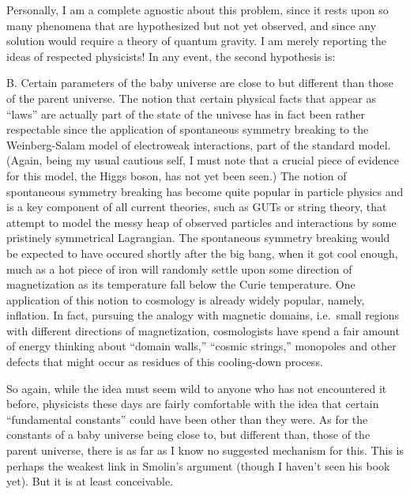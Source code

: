 \documentclass{article}
\begin{document}
Personally, I am a complete agnostic about this problem, since it rests
upon so many phenomena that are hypothesized but not yet observed, and
since any solution would require a theory of quantum gravity. I am
merely reporting the ideas of respected physicists! In any event, the
second hypothesis is:

B. Certain parameters of the baby universe are close to but different
than those of the parent universe. The notion that certain physical
facts that appear as ``laws'' are actually part of the state of the
univese has in fact been rather respectable since the application of
spontaneous symmetry breaking to the Weinberg-Salam model of electroweak
interactions, part of the standard model. (Again, being my usual
cautious self, I must note that a crucial piece of evidence for this
model, the Higgs boson, has not yet been seen.) The notion of
spontaneous symmetry breaking has become quite popular in particle
physics and is a key component of all current theories, such as GUTs or
string theory, that attempt to model the messy heap of observed
particles and interactions by some pristinely symmetrical Lagrangian.
The spontaneous symmetry breaking would be expected to have occured
shortly after the big bang, when it got cool enough, much as a hot piece
of iron will randomly settle upon some direction of magnetization as its
temperature fall below the Curie temperature. One application of this
notion to cosmology is already widely popular, namely, inflation. In
fact, pursuing the analogy with magnetic domains, i.e.~small regions
with different directions of magnetization, cosmologists have spend a
fair amount of energy thinking about ``domain walls,'' ``cosmic
strings,'' monopoles and other defects that might occur as residues of
this cooling-down process.

So again, while the idea must seem wild to anyone who has not
encountered it before, physicists these days are fairly comfortable with
the idea that certain ``fundamental constants'' could have been other
than they were. As for the constants of a baby universe being close to,
but different than, those of the parent universe, there is as far as I
know no suggested mechanism for this. This is perhaps the weakest link
in Smolin's argument (though I haven't seen his book yet). But it is at
least conceivable.
\end{document}
